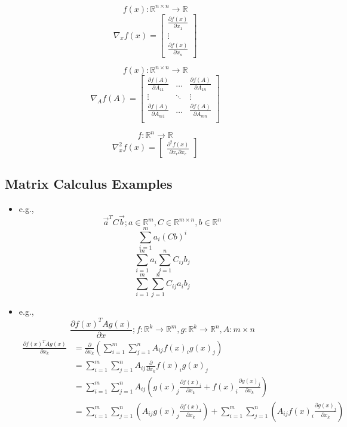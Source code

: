 \begin{defn}
	$$f(x):\mathbb{R}^{n\times n}\to \mathbb{R}$$
	$$\nabla_{x}f(x)=\begin{bmatrix}
		\frac{\partial f(x)}{\partial x_1}\\
		\vdots \\
		\frac{\partial f(x)}{\partial x_n}
	\end{bmatrix} $$
\end{defn}

\begin{defn}
	$$f(x):\mathbb{R}^{n\times n}\to \mathbb{R}$$
	$$\nabla_{A}f(A)=\begin{bmatrix}
		\frac{\partial f(A)}{\partial A_{11}} & \ldots & \frac{\partial f(A)}{\partial A_{1n}}\\
		\vdots &\ddots & \vdots \\
		\frac{\partial f(A)}{\partial A_{m1}} & \ldots & \frac{\partial f(A)}{\partial A_{mn}}\\
	\end{bmatrix} $$
\end{defn}

\begin{defn}[Hessian]
	$$f:\mathbb{R}^n \to\mathbb{R}$$
	$$\nabla_x^{2}f(x)=\begin{bmatrix}
		\frac{\partial^2 f(x)}{\partial x_r \partial x_c}
	\end{bmatrix}$$
\end{defn}

\subsection{Matrix Calculus Examples}
\begin{itemize}
	\item e.g.,
	$$\vec{a}^{T}C\vec{b}; a\in\mathbb{R}^m, C\in\mathbb{R}^{m\times n}, b\in\mathbb{R}^n$$
	$$\sum_{i=1}^m a_i (Cb)^i$$
	$$\sum_{i=1}^m a_i \sum_{j=1}^n C_{ij} b_j$$
	$$\sum_{i=1}^{m}\sum_{j=1}^n C_{ij}a_i b_j$$
	\item e.g.,
	$$\frac{\partial f(x)^T A g(x)}{\partial x}; f:\mathbb{R}^k\to\mathbb{R}^m, g:\mathbb{R}^k\to\mathbb{R}^n, A: m\times n$$
	$$\begin{aligned}
		\frac{\partial f(x)^T A g(x)}{\partial x_k} &= \frac{\partial}{\partial x_k}\left( \sum_{i=1}^{m}\sum_{j=1}^n A_{ij} f(x)_i g(x)_j\right)\\
		&= \sum_{i=1}^m \sum_{j=1}^n A_{ij} \frac{\partial}{\partial x_k} f(x)_i g(x)_j\\
		&= \sum_{i=1}^m \sum_{j=1}^n A_{ij} \left( g(x)_j \frac{\partial f(x)_i}{\partial x_k} + f(x)_i \frac{\partial g(x)_j}{\partial x_k} \right)\\
		&= \sum_{i=1}^m\sum_{j=1}^{n}\left( A_{ij}g(x)_j \frac{\partial f(x)_i}{\partial x_k} \right) + \sum_{i=1}^m\sum_{j=1}^n\left( A_{ij} f(x)_i \frac{\partial g(x)_j}{\partial x_k} \right)
 	\end{aligned}$$
\end{itemize}